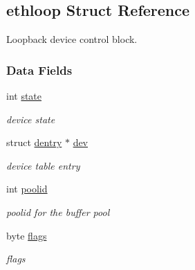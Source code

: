\hypertarget{structethloop}{}\subsection{ethloop Struct Reference}
\label{structethloop}


Loopback device control block.  


\subsubsection*{Data Fields}
\begin{DoxyCompactItemize}
\item 
\mbox{\label{structethloop_a19f8184f8019cd8cf85d55ac81d1c68c}} 
int \hyperlink{structethloop_a19f8184f8019cd8cf85d55ac81d1c68c}{state}
\begin{DoxyCompactList}\small\item\em device state \end{DoxyCompactList}\item 
\mbox{\label{structethloop_ab07150f4e07c316af259952d512c256b}} 
struct \hyperlink{structdentry}{dentry} $\ast$ \hyperlink{structethloop_ab07150f4e07c316af259952d512c256b}{dev}
\begin{DoxyCompactList}\small\item\em device table entry \end{DoxyCompactList}\item 
\mbox{\label{structethloop_a210b4a8d5628a2c2f31c3feecf8ad464}} 
int \hyperlink{structethloop_a210b4a8d5628a2c2f31c3feecf8ad464}{poolid}
\begin{DoxyCompactList}\small\item\em poolid for the buffer pool \end{DoxyCompactList}\item 
\mbox{\label{structethloop_ad0cbcdb6c773eadd12ace3c17962de83}} 
byte \hyperlink{structethloop_ad0cbcdb6c773eadd12ace3c17962de83}{flags}
\begin{DoxyCompactList}\small\item\em flags \end{DoxyCompactList}\item 
\mbox{\label{structethloop_a9b0bcc49c4ac9dce3f34df3611f2c964}} 

\end{DoxyCompactItemize}
